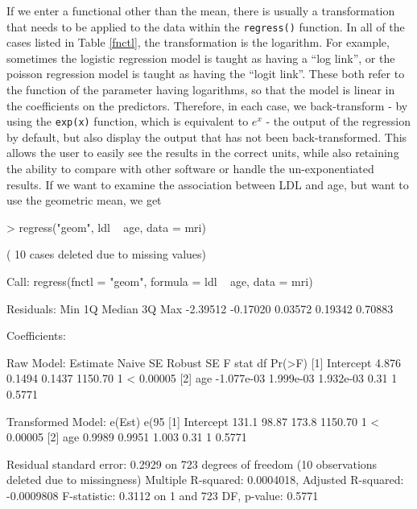 \documentclass[landscape]{article}
\renewenvironment{Schunk}{\vspace{\topsep}}{\vspace{\topsep}}
\begin{document}
If we enter a functional other than the mean, there is usually a transformation that needs to be applied to the data within the \texttt{regress()} function. In all of the cases listed in Table \ref{fnctl}, the transformation is the logarithm. For example, sometimes the logistic regression model is taught as having a ``log link'', or the poisson regression model is taught as having the ``logit link''. These both refer to the function of the parameter having logarithms, so that the model is linear in the coefficients on the predictors. Therefore, in each case, we back-transform - by using the \texttt{exp(x)} function, which is equivalent to $e^x$ - the output of the regression by default, but also display the output that has not been back-transformed. This allows the user to easily see the results in the correct units, while also retaining the ability to compare with other software or handle the un-exponentiated results. If we want to examine the association between LDL and age, but want to use the geometric mean, we get
\begin{Schunk}
\begin{Sinput}
> regress("geom", ldl ~ age, data = mri)
\end{Sinput}
\begin{Soutput}
( 10  cases deleted due to missing values)


Call:
regress(fnctl = "geom", formula = ldl ~ age, data = mri)

Residuals:
     Min       1Q   Median       3Q      Max 
-2.39512 -0.17020  0.03572  0.19342  0.70883 

Coefficients:

Raw Model:
                 Estimate   Naive SE   Robust SE        F stat    df Pr(>F)   
[1] Intercept       4.876     0.1494     0.1437           1150.70 1  < 0.00005
[2] age          -1.077e-03  1.999e-03  1.932e-03            0.31 1    0.5771 

Transformed Model:
                 e(Est)    e(95%
[1] Intercept      131.1     98.87     173.8           1150.70 1  < 0.00005
[2] age            0.9989    0.9951    1.003              0.31 1    0.5771 

Residual standard error: 0.2929 on 723 degrees of freedom
  (10 observations deleted due to missingness)
Multiple R-squared:  0.0004018,	Adjusted R-squared:  -0.0009808 
F-statistic: 0.3112 on 1 and 723 DF,  p-value: 0.5771
\end{Soutput}
\end{Schunk}
\end{document}
